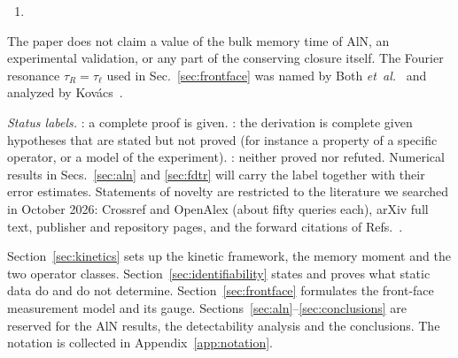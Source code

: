 \begin{enumerate}
depth-scaling gauge of the Fourier problem persists: the film enters only through
$(\xi_1,b,\tau_R,\tau_\ell)$, so neither $\ell$ nor the closure coefficient is separately identifiable
(Proposition~\ref{prop:gauge} and Corollary~\ref{cor:beta}). The Fourier gauge is
known~\cite{KrapezRigollet2017}; its extension to non-Fourier laws is elementary dimensional analysis and is
potentially novel within the literature searched. Whether the four combinations are themselves identifiable is
the subject of a theorem stated in Sec.~\ref{sec:frontface}: .
\item {}
\end{enumerate}

The paper does not claim a value of the bulk memory time of AlN, an experimental validation, or any
part of the conserving closure itself. The Fourier resonance $\tau_R=\tau_\ell$ used in
Sec.~\ref{sec:frontface} was named by Both \emph{et~al.}~\cite{Both2016} and analyzed by
Kov\'acs~\cite{Kovacs2018}.

\emph{Status labels.} : a complete proof is given. :
the derivation is complete given hypotheses that are stated but not proved (for instance a property of a
specific operator, or a model of the experiment). : neither proved nor refuted. Numerical
results in Secs.~\ref{sec:aln} and \ref{sec:fdtr} will carry the label
 together with their error estimates. Statements of novelty are
restricted to the literature we searched in October 2026: Crossref and OpenAlex (about fifty queries
each), arXiv full text, publisher and repository pages, and the forward citations of
Refs.~\cite{BenTalTeboulle1990,Stewart1989}.

Section~\ref{sec:kinetics} sets up the kinetic framework, the memory moment and the two operator
classes. Section~\ref{sec:identifiability} states and proves what static data do and do not determine.
Section~\ref{sec:frontface} formulates the front-face measurement model and its gauge.
Sections~\ref{sec:aln}--\ref{sec:conclusions} are reserved for the AlN results, the detectability
analysis and the conclusions. The notation is collected in Appendix~\ref{app:notation}.
